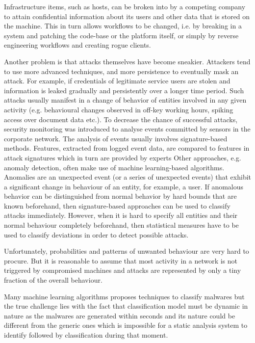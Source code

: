 \documentclass[a4paper, 12pt]{article}
\begin{document}
\par Infrastructure items, such as hosts, can be broken into by a competing company to attain confidential information about its users and other data that is stored on the machine. This in turn allows workflows to be changed, i.e. by breaking in a system and patching the code-base or the platform itself, or simply by reverse engineering workflows and creating rogue clients.
\\

\par 
Another problem is that attacks themselves have become sneakier. Attackers tend to use more advanced techniques, and more persistence to eventually mask an attack. For example, if credentials of legitimate service users are stolen and information is leaked gradually and persistently over a longer time period. Such attacks usually manifest in a change of behavior of entities involved in any given activity (e.g. behavioural changes observed in off-key working hours, spiking access over document data etc.). To decrease the chance of successful attacks, security monitoring was introduced to analyse events committed by sensors in the corporate network. The analysis of events usually involves signature-based methods. Features, extracted from logged event data, are compared to features in attack signatures which in turn are provided by experts Other approaches, e.g. anomaly detection, often make use of machine learning-based algorithms. Anomalies are an unexpected event (or a series of unexpected events) that exhibit a significant change in behaviour of an entity, for example, a user. If anomalous behavior can be distinguished from normal behavior by hard bounds that are known beforehand, then signature-based approaches can be used to classify attacks immediately. However, when it is hard to specify all entities and their normal behaviour completely beforehand, then statistical measures have to be used to classify deviations in order to detect possible attacks.
\\

\par
Unfortunately, probabilities and patterns of unwanted behaviour are very hard to procure. But it is reasonable to assume that most activity in a network is not triggered by compromised machines and attacks are represented by only a tiny fraction of the overall behaviour. 
\\

\par
Many machine learning algorithms proposes techniques to classify malwares but
the true challenge lies with the fact that classification model must be dynamic
in nature as the malwares are generated within seconds and its nature could be
different from the generic ones which is impossible for a static analysis system to
identify followed by classification during that moment.
\end{document}
